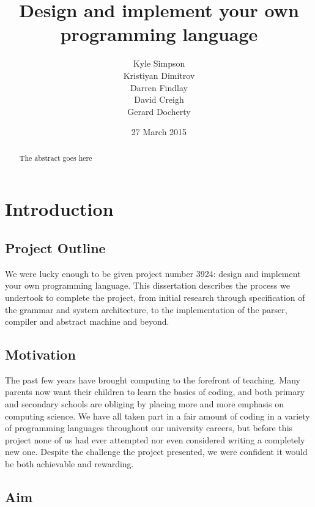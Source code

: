 \documentclass{l3proj}
\begin{document}
\title{Design and implement your own programming language}
\author{Kyle Simpson\\
		Kristiyan Dimitrov\\
		Darren Findlay\\
		David Creigh\\
		Gerard Docherty}
\date{27 March 2015}
\maketitle
\begin{abstract}

The abstract goes here

\end{abstract}
\educationalconsent
\tableofcontents
\chapter{Introduction}
\label{intro}

\section{Project Outline}

We were lucky enough to be given project number 3924: design and implement your own programming language. This dissertation describes the process we undertook to complete the project, from initial research through specification of the grammar and system architecture, to the implementation of the parser, compiler and abstract machine and beyond.

\section{Motivation}

The past few years have brought computing to the forefront of teaching. Many parents now want their children to learn the basics of coding, and both primary and secondary schools are obliging by placing more and more emphasis on computing science. We have all taken part in a fair amount of coding in a variety of programming languages throughout our university careers, but before this project none of us had ever attempted nor even considered writing a completely new one. Despite the challenge the project presented, we were confident it would be both achievable and rewarding.

\section{Aim}
\end{document}
